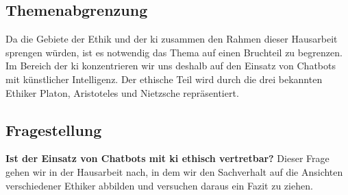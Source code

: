 \subsection{Themenabgrenzung}
Da die Gebiete der Ethik und der \ac{ki} zusammen den Rahmen dieser Hausarbeit sprengen würden, ist es notwendig das Thema auf einen Bruchteil zu begrenzen. Im Bereich der \ac{ki} konzentrieren wir uns deshalb auf den Einsatz von Chatbots mit künstlicher Intelligenz. Der ethische Teil wird durch die drei bekannten Ethiker Platon, Aristoteles und Nietzsche repräsentiert. 

\subsection{Fragestellung}
\textbf{Ist der Einsatz von Chatbots mit \ac{ki} ethisch vertretbar?}
Dieser Frage gehen wir in der Hausarbeit nach, in dem wir den Sachverhalt auf die Ansichten verschiedener Ethiker abbilden und versuchen daraus ein Fazit zu ziehen.
